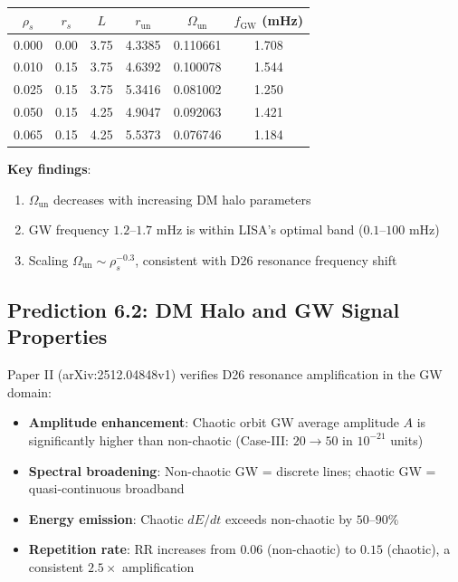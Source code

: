\documentclass[12pt]{article}
\begin{document}
\begin{table}[H]
\centering
\begin{tabular}{c c c c c c}
\toprule
$\rho_s$ & $r_s$ & $L$ & $r_{\text{un}}$ & $\Omega_{\text{un}}$ & $f_{\text{GW}}$ (mHz) \\
\midrule
0.000 & 0.00 & 3.75 & 4.3385 & 0.110661 & 1.708 \\
0.010 & 0.15 & 3.75 & 4.6392 & 0.100078 & 1.544 \\
0.025 & 0.15 & 3.75 & 5.3416 & 0.081002 & 1.250 \\
0.050 & 0.15 & 4.25 & 4.9047 & 0.092063 & 1.421 \\
0.065 & 0.15 & 4.25 & 5.5373 & 0.076746 & 1.184 \\
\bottomrule
\end{tabular}
\end{table}

\textbf{Key findings}:
\begin{enumerate}
\item $\Omega_{\text{un}}$ decreases with increasing DM halo parameters
\item GW frequency $1.2$--$1.7$ mHz is within LISA's optimal band ($0.1$--$100$ mHz)
\item Scaling $\Omega_{\text{un}} \sim \rho_s^{-0.3}$, consistent with D26 resonance frequency shift
\end{enumerate}

\subsection{Prediction 6.2: DM Halo and GW Signal Properties}

Paper II (arXiv:2512.04848v1) verifies D26 resonance amplification in the GW domain:
\begin{itemize}
\item \textbf{Amplitude enhancement}: Chaotic orbit GW average amplitude $A$ is significantly higher than non-chaotic (Case-III: $20 \to 50$ in $10^{-21}$ units)
\item \textbf{Spectral broadening}: Non-chaotic GW = discrete lines; chaotic GW = quasi-continuous broadband
\item \textbf{Energy emission}: Chaotic $dE/dt$ exceeds non-chaotic by $50$--$90\%$
\item \textbf{Repetition rate}: RR increases from $0.06$ (non-chaotic) to $0.15$ (chaotic), a consistent $2.5\times$ amplification
\end{itemize}
\end{document}
